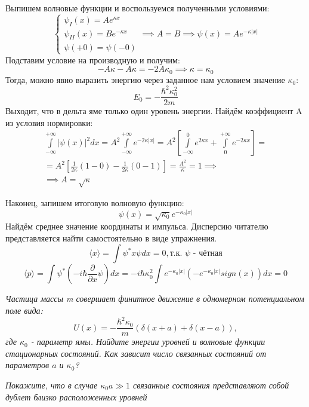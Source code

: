 Выпишем волновые функции и воспользуемся полученными условиями:
\[
\begin{cases}
    \psi_I(x) = Ae^{\kappa x}\\
    \psi_{II}(x) = Be^{-\kappa x}\\
    \psi(+0) = \psi(-0)
\end{cases}
\implies A = B \implies \psi(x) = Ae^{-\kappa|x|}
\]
Подставим условие на производную и получим:
\[
-A\kappa - A\kappa = -2A\kappa_0 \implies \kappa = \kappa_0 
\]
Тогда, можно явно выразить энергию через заданное нам условием значение $\kappa_0$:
\[
E_0 = - \frac{\hbar^2 \kappa_0^2}{2m}
\]
Выходит, что в дельта яме только один уровень энергии. Найдём коэффициент A из условия нормировки:
\begin{gather*}
\int\limits_{-\infty}^{+\infty} |\psi(x)|^2 dx = A^2\int\limits_{-\infty}^{+\infty} e^{-2\kappa |x|} = A^2\left[\int\limits_{-\infty}^0 e^{2\kappa x} + \int\limits_0^{+\infty} e^{-2\kappa x}\right] =\\
= A^2\left[ \frac{1}{2\kappa}(1 - 0) - \frac{1}{2\kappa}(0-1)\right] = \frac{A^2}{\kappa} = 1 \implies  \\ \implies  A = \sqrt{\kappa}
\end{gather*}


Наконец, запишем итоговую волновую функцию:
\[
\psi(x) = \sqrt{\kappa_0}e^{-\kappa_0 |x|}
\]
Найдём среднее значение координаты и импульса. Дисперсию читателю представляется найти самостоятельно в виде упражнения.
\[
\langle x \rangle = \int\psi^*x\psi dx = 0, \text{т.к. $\psi$ - чётная}
\]
\[
\langle p \rangle = \int\psi^*(-i\hbar\frac{\partial}{\partial x}\psi) dx = -i\hbar\kappa_0^2\int e^{-\kappa_0|x|}(-e^{-\kappa_0|x|}sign(x)) dx = 0
\]
\begin{center}
    \textit{Частица массы m совершает финитное движение в одномерном потенциальном поле вида:}
    \[
    U(x) = -\frac{\hbar^2\kappa_0}{m}(\delta(x+a) + \delta(x-a)),
    \]
    \textit{где $\kappa_0$ - параметр ямы. Найдите энергии уровней и волновые функции стационарных состояний. Как зависит число связанных состояний от параметров $a$ и $\kappa_0$?}
    
    \textit{Покажите, что в случае $\kappa_0a \gg 1$ связанные состояния представляют собой дублет близко расположенных уровней}
\end{center}

